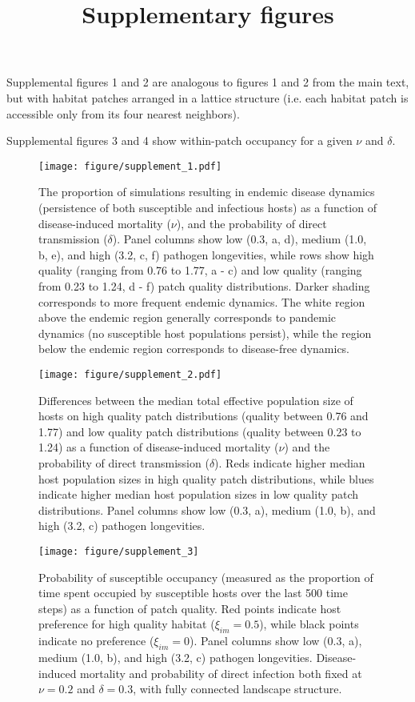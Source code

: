 \documentclass{article}
\title{Supplementary figures}
\begin{document}
\maketitle

Supplemental figures 1 and 2 are analogous to figures 1 and 2 from the main text, but with habitat patches arranged in a lattice structure (i.e. each habitat patch is accessible only from its four nearest neighbors).

Supplemental figures 3 and 4 show within-patch occupancy for a given $\nu$ and $\delta$.

\begin{figure}
\texttt{[image: figure/supplement\_1.pdf]}
\caption{The proportion of simulations resulting in endemic disease dynamics (persistence of both susceptible and infectious hosts) as a function of disease-induced mortality ($\nu$), and the probability of direct transmission ($\delta$).  Panel columns show low (0.3, a, d), medium (1.0, b, e), and high (3.2, c, f) pathogen longevities, while rows show high quality (ranging from 0.76 to 1.77, a - c) and low quality (ranging from 0.23 to 1.24, d - f) patch quality distributions.  Darker shading corresponds to more frequent endemic dynamics.  The white region above the endemic region generally corresponds to pandemic dynamics (no susceptible host populations persist), while the region below the endemic region corresponds to disease-free dynamics.}
\label{endemic}
\end{figure}

\begin{figure}
\texttt{[image: figure/supplement\_2.pdf]}
\centering
\caption{Differences between the median total effective population size of hosts on high quality patch distributions (quality between 0.76 and 1.77) and low quality patch distributions (quality between 0.23 to 1.24) as a function of disease-induced mortality ($\nu$) and the probability of direct transmission ($\delta$).  Reds indicate higher median host population sizes in high quality patch distributions, while blues indicate higher median host population sizes in low quality patch distributions.  Panel columns show low (0.3, a), medium (1.0, b), and high (3.2, c) pathogen longevities.}
\label{highvlow}
\end{figure}

\begin{figure}
\texttt{[image: figure/supplement\_3]}
\centering
\caption{Probability of susceptible occupancy (measured as the proportion of time spent occupied by susceptible hosts over the last 500 time steps) as a function of patch quality. Red points indicate host preference for high quality habitat ($\xi_{im} = 0.5$), while black points indicate no preference ($\xi_{im} = 0$). Panel columns show low (0.3, a), medium (1.0, b), and high (3.2, c) pathogen longevities.  Disease-induced mortality and probability of direct infection both fixed at $\nu = 0.2$ and $\delta = 0.3$, with fully connected landscape structure.}
\end{figure}
\end{document}
